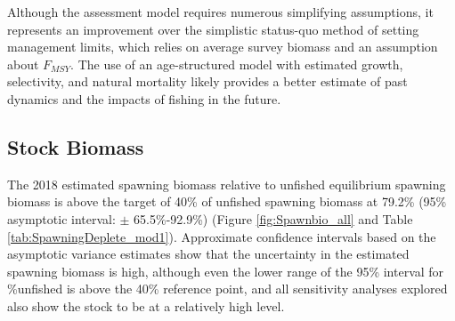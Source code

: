 \documentclass[12pt,]{article}
\begin{document}
Although the assessment model requires numerous simplifying assumptions,
it represents an improvement over the simplistic status-quo method of
setting management limits, which relies on average survey biomass and an
assumption about \(F_{MSY}\). The use of an age-structured model with
estimated growth, selectivity, and natural mortality likely provides a
better estimate of past dynamics and the impacts of fishing in the
future.

\hypertarget{stock-biomass}{%
\subsection*{Stock Biomass}\label{stock-biomass}}

The 2018 estimated spawning biomass relative to unfished equilibrium
spawning biomass is above the target of 40\% of unfished spawning
biomass at 79.2\% (95\% asymptotic interval: \(\pm\) 65.5\%-92.9\%)
(Figure \ref{fig:Spawnbio_all} and Table
\ref{tab:SpawningDeplete_mod1}). Approximate confidence intervals based
on the asymptotic variance estimates show that the uncertainty in the
estimated spawning biomass is high, although even the lower range of the
95\% interval for \%unfished is above the 40\% reference point, and all
sensitivity analyses explored also show the stock to be at a relatively
high level.

\vspace{.5cm}

\FloatBarrier
\end{document}
